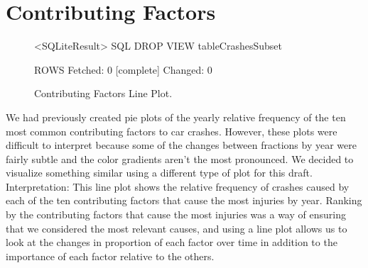 \documentclass[10pt]{article}
\begin{document}
\section{Contributing Factors}
\begin{figure}[H]
\centering
\begin{Schunk}
\begin{Soutput}
<SQLiteResult>
  SQL  
DROP VIEW tableCrashesSubset

  ROWS Fetched: 0 [complete]
       Changed: 0
\end{Soutput}
\end{Schunk}
\caption{Contributing Factors Line Plot.}
\end{figure}

We had previously created pie plots of the yearly relative frequency of the ten most common contributing factors to car crashes. However, these plots were difficult to interpret because some of the changes between fractions by year were fairly subtle and the color gradients aren’t the most pronounced. We decided to visualize something similar using a different type of plot for this draft. \\
\noindent
Interpretation: This line plot shows the relative frequency of crashes caused by each of the ten contributing factors that cause the most injuries by year. Ranking by the contributing factors that cause the most injuries was a way of ensuring that we considered the most relevant causes, and using a line plot allows us to look at the changes in proportion of each factor over time in addition to the importance of each factor relative to the others.
\end{document}
